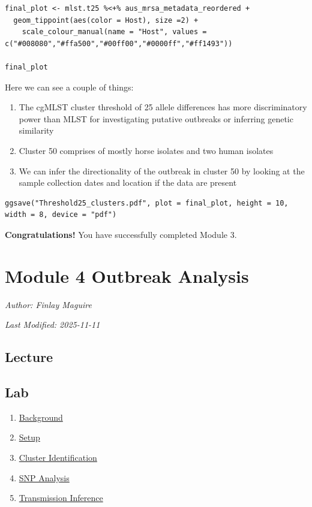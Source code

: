 \documentclass[
]{book}
\providecommand{\tightlist}{%
  \setlength{\itemsep}{0pt}\setlength{\parskip}{0pt}}
\begin{document}
\begin{verbatim}
final_plot <- mlst.t25 %<+% aus_mrsa_metadata_reordered +
  geom_tippoint(aes(color = Host), size =2) +
    scale_colour_manual(name = "Host", values = c("#008080","#ffa500","#00ff00","#0000ff","#ff1493"))

final_plot
\end{verbatim}

Here we can see a couple of things:

\begin{enumerate}
\def\labelenumi{\arabic{enumi}.}
\tightlist
\item
  The cgMLST cluster threshold of 25 allele differences has more discriminatory power than MLST for investigating putative outbreaks or inferring genetic similarity
\item
  Cluster 50 comprises of mostly horse isolates and two human isolates
\item
  We can infer the directionality of the outbreak in cluster 50 by looking at the sample collection dates and location if the data are present
\end{enumerate}

\begin{verbatim}
ggsave("Threshold25_clusters.pdf", plot = final_plot, height = 10, width = 8, device = "pdf")

\end{verbatim}

\textbf{Congratulations!} You have successfully completed Module 3.

\chapter{Module 4 Outbreak Analysis}\label{module-4-outbreak-analysis}

\emph{Author: Finlay Maguire}

\emph{Last Modified: 2025-11-11}

\section{Lecture}\label{lecture-3}

\section{Lab}\label{lab-3}

\begin{enumerate}
\def\labelenumi{\arabic{enumi}.}
\tightlist
\item
  \hyperref[intro1]{Background}
\item
  \hyperref[setup1]{Setup}
\item
  \hyperref[cluster]{Cluster Identification}
\item
  \hyperref[snp]{SNP Analysis}
\item
  \hyperref[trans]{Transmission Inference}
\end{enumerate}
\end{document}
